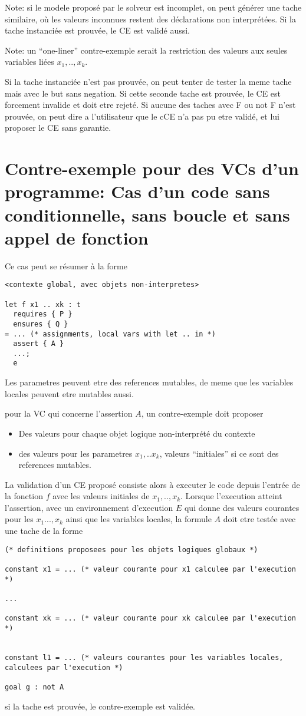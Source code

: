 \documentclass[a4paper,twoside]{article}
\begin{document}
Note: si le modele proposé par le solveur est incomplet, on peut générer une
tache similaire, où les valeurs inconnues restent des déclarations non
interprétées. Si la tache instanciée est prouvée, le CE est validé aussi.

Note: un ``one-liner'' contre-exemple serait la restriction des valeurs aux
seules variables liées $x_1,..,x_k$.

Si la tache instanciée n'est pas prouvée, on peut tenter de tester la meme tache
mais avec le but sans negation. Si cette seconde tache est prouvée, le CE est
forcement invalide et doit etre rejeté. Si aucune des taches avec F ou not F
n'est prouvée, on peut dire a l'utilisateur que le cCE n'a pas pu etre validé,
et lui proposer le CE sans garantie.


\section{Contre-exemple pour des VCs d'un programme: Cas d'un code sans
  conditionnelle, sans boucle et sans appel de fonction}

Ce cas peut se résumer à la forme

\begin{lstlisting}
<contexte global, avec objets non-interpretes>

let f x1 .. xk : t
  requires { P }
  ensures { Q }
= ... (* assignments, local vars with let .. in *)
  assert { A }
  ...;
  e
\end{lstlisting}
Les parametres peuvent etre des references mutables, de meme que les variables
locales peuvent etre mutables aussi.

pour la VC qui concerne l'assertion $A$, un contre-exemple doit proposer
\begin{itemize}
\item Des valeurs pour chaque objet logique non-interprété du contexte
\item des valeurs pour les parametres $x_1,..x_k$, valeurs ``initiales'' si ce
  sont des references mutables.
\end{itemize}

La validation d'un CE proposé consiste alors à executer le code depuis l'entrée
de la fonction $f$ avec les valeurs initiales de $x_1,..,x_k$. Lorsque l'execution atteint l'assertion, avec un environnement d'execution $E$ qui donne des valeurs courantes pour les $x_1...,x_k$ ainsi que les variables locales, la formule $A$ doit etre testée avec une tache de la forme
\begin{lstlisting}
(* definitions proposees pour les objets logiques globaux *)

constant x1 = ... (* valeur courante pour x1 calculee par l'execution *)

...

constant xk = ... (* valeur courante pour xk calculee par l'execution *)


constant l1 = ... (* valeurs courantes pour les variables locales, calculees par l'execution *)

goal g : not A
\end{lstlisting}
si la tache est prouvée, le contre-exemple est validée.
\end{document}
